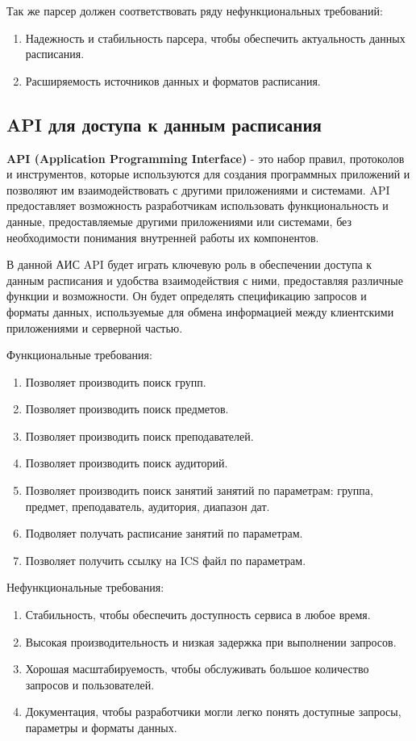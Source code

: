 Так же парсер должен соответствовать ряду нефункциональных требований:
\begin{enumerate}
  \item Надежность и стабильность парсера, чтобы обеспечить актуальность данных расписания.
  \item Расширяемость источников данных и форматов расписания.
\end{enumerate}

\subsection{API для доступа к данным расписания}
\textbf{API (Application Programming Interface)} - это набор правил, протоколов и инструментов,
которые используются для создания программных приложений и позволяют им взаимодействовать с другими приложениями и системами.
API предоставляет возможность разработчикам использовать функциональность и данные,
предоставляемые другими приложениями или системами,
без необходимости понимания внутренней работы их компонентов.

В данной АИС API будет играть ключевую роль в обеспечении доступа к данным расписания
и удобства взаимодействия с ними, предоставляя различные функции и возможности.
Он будет определять спецификацию запросов и форматы данных,
используемые для обмена информацией между клиентскими приложениями и серверной частью.

Функциональные требования:
\begin{enumerate}
  \item Позволяет производить поиск групп.
  \item Позволяет производить поиск предметов.
  \item Позволяет производить поиск преподавателей.
  \item Позволяет производить поиск аудиторий.
  \item Позволяет производить поиск занятий занятий по параметрам:
  группа, предмет, преподаватель, аудитория, диапазон дат.
  \item Подволяет получать расписание занятий по параметрам.
  \item Позволяет получить ссылку на ICS файл по параметрам.
\end{enumerate}

Нефункциональные требования:
\begin{enumerate}
  \item Стабильность, чтобы обеспечить доступность сервиса в любое время.
  \item Высокая производительность и низкая задержка при выполнении запросов.
  \item Хорошая масштабируемость, чтобы обслуживать большое количество запросов и пользователей.
  \item Документация, чтобы разработчики могли легко понять доступные запросы,
  параметры и форматы данных.
\end{enumerate}

